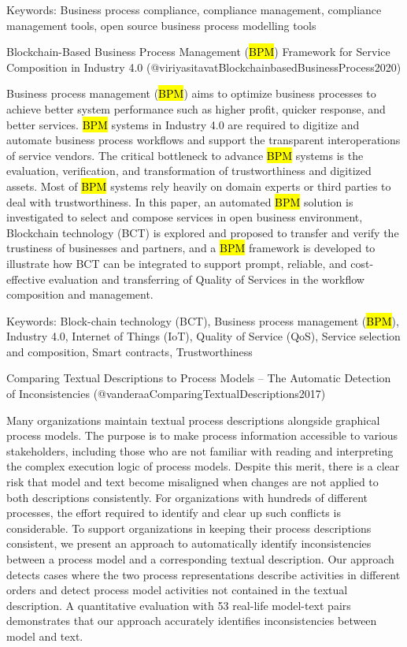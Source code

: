 \documentclass[
  letterpaper,
  DIV=11,
  numbers=noendperiod]{scrartcl}
\begin{document}
Keywords: Business process compliance, compliance management, compliance
management tools, open source business process modelling tools

Blockchain-Based Business Process Management (\hl{BPM}) Framework for
Service Composition in Industry 4.0
(@viriyasitavatBlockchainbasedBusinessProcess2020)

Business process management (\hl{BPM}) aims to optimize business
processes to achieve better system performance such as higher profit,
quicker response, and better services. \hl{BPM} systems in Industry 4.0
are required to digitize and automate business process workflows and
support the transparent interoperations of service vendors. The critical
bottleneck to advance \hl{BPM} systems is the evaluation, verification,
and transformation of trustworthiness and digitized assets. Most of
\hl{BPM} systems rely heavily on domain experts or third parties to deal
with trustworthiness. In this paper, an automated \hl{BPM} solution is
investigated to select and compose services in open business
environment, Blockchain technology (BCT) is explored and proposed to
transfer and verify the trustiness of businesses and partners, and a
\hl{BPM} framework is developed to illustrate how BCT can be integrated
to support prompt, reliable, and cost-effective evaluation and
transferring of Quality of Services in the workflow composition and
management.

Keywords: Block-chain technology (BCT), Business process management
(\hl{BPM}), Industry 4.0, Internet of Things (IoT), Quality of Service
(QoS), Service selection and composition, Smart contracts,
Trustworthiness

Comparing Textual Descriptions to Process Models -- The Automatic
Detection of Inconsistencies (@vanderaaComparingTextualDescriptions2017)

Many organizations maintain textual process descriptions alongside
graphical process models. The purpose is to make process information
accessible to various stakeholders, including those who are not familiar
with reading and interpreting the complex execution logic of process
models. Despite this merit, there is a clear risk that model and text
become misaligned when changes are not applied to both descriptions
consistently. For organizations with hundreds of different processes,
the effort required to identify and clear up such conflicts is
considerable. To support organizations in keeping their process
descriptions consistent, we present an approach to automatically
identify inconsistencies between a process model and a corresponding
textual description. Our approach detects cases where the two process
representations describe activities in different orders and detect
process model activities not contained in the textual description. A
quantitative evaluation with 53 real-life model-text pairs demonstrates
that our approach accurately identifies inconsistencies between model
and text.
\end{document}
